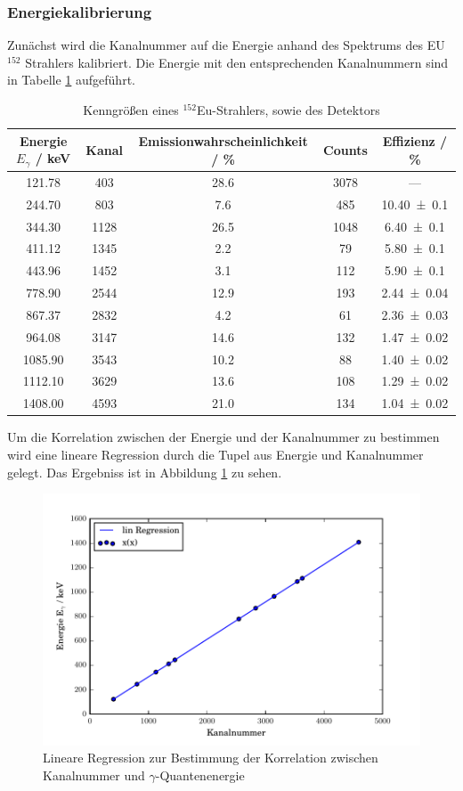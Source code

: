 \subsubsection{Energiekalibrierung}
Zunächst wird die Kanalnummer auf die Energie anhand des Spektrums des EU$^{152}$ Strahlers kalibriert. Die Energie mit den entsprechenden Kanalnummern sind in Tabelle \ref{tab:CsSpekt} aufgeführt.
\begin{table}
  \centering
  \caption{Kenngrößen eines $^{152}$Eu-Strahlers, sowie des Detektors}
  \begin{tabular}{c | c c c c}
    \toprule
    Energie $E_{\gamma}$ / keV& Kanal & Emissionwahrscheinlichkeit / \% & Counts & Effizienz / \% \\
    \hline
    121.78	& 403	& 28.6	& 3078 	& ---	\\
    244.70	& 803	& 7.6	& 485 	& \num{10.40 +- 0.1}	\\
    344.30	& 1128	& 26.5	& 1048	& \num{6.40 +- 0.1}	\\
    411.12	& 1345	& 2.2	& 79	& \num{5.80 +- 0.1}	\\
    443.96	& 1452	& 3.1	& 112 	& \num{5.90 +- 0.1}	\\
    778.90	& 2544	& 12.9	& 193	& \num{2.44 +- 0.04}	\\
    867.37	& 2832	& 4.2	& 61	& \num{2.36 +- 0.03}	\\
    964.08	& 3147	& 14.6	& 132	& \num{1.47 +- 0.02}	\\
    1085.90	& 3543	& 10.2	& 88	& \num{1.40 +- 0.02}	\\
    1112.10	& 3629	& 13.6	& 108	& \num{1.29 +- 0.02}	\\
    1408.00	& 4593	& 21.0 	& 134	& \num{1.04 +- 0.02}	\\
    \bottomrule
  \end{tabular}
  \label{tab:CsSpekt}
\end{table}
Um die Korrelation zwischen der Energie und der Kanalnummer zu bestimmen wird eine lineare Regression durch die Tupel aus Energie und Kanalnummer gelegt. Das Ergebniss ist in Abbildung \ref{fig:RegCs} zu sehen.
\begin{figure}[htpb]
  \centering
  \includegraphics[width=\textwidth]{./build/CsReg.pdf}
  \caption{Lineare Regression zur Bestimmung der Korrelation zwischen Kanalnummer und $\gamma$-Quantenenergie}
  \label{fig:RegCs}
\end{figure}

